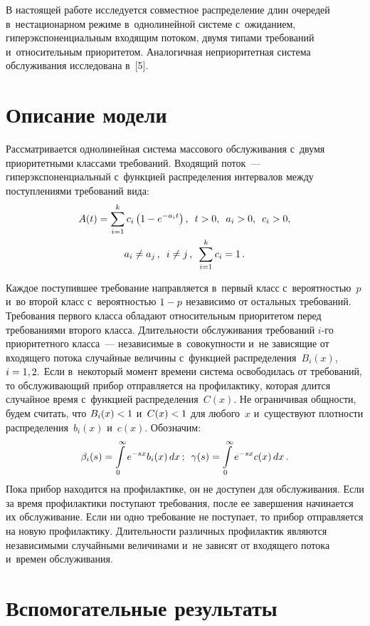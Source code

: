 \begin{multicols}{2}
В настоящей работе исследуется совместное распределение длин
очередей в~нестационарном режиме в~однолинейной системе 
с~ожиданием, гиперэкспоненциальным входящим потоком, двумя типами
требований и~относительным приоритетом. Аналогичная неприоритетная
система обслуживания исследована в~[5].

\vspace*{-6pt}

\section{Описание модели}

Рассматривается однолинейная система массового обслуживания 
с~двумя приоритетными классами требований. Входящий поток~---
гиперэкспоненциальный с~функцией распределения интервалов между
поступлениями требований вида:
\begin{multline*}
A(t)=\sum\limits_{i=1}^kc_i\left(1-e^{-a_it}\right),\enskip t>0,\enskip
a_i>0,\enskip c_i>0,\\
a_i\ne a_j\,,\enskip i\ne j\,,\enskip  \sum\limits_{i=1}^k c_i=1\,.
\end{multline*}

Каждое поступившее требование направляется в~первый класс 
с~вероятностью~$p$ и~во второй класс с~вероятностью $1\hm-p$
независимо от остальных требований. Требования первого класса
обладают относительным приоритетом перед требованиями второго
класса. Длительности обслуживания требований $i$-го приоритетного
класса~--- независимые в~совокупности и~не зависящие от входящего
потока случайные величины с~функцией распределения~$B_i(x)$,
$i\hm=1,2.$
 Если в~некоторый момент времени система освободилась от требований, 
 то обслуживающий прибор
 отправляется на профилактику, которая длится случайное время с~функцией 
 распределения~$C(x).$
 Не ограничивая общности, будем считать, что $B_i(x)\hm<1$
 и~$C(x)\hm<1$  для любого~$x$ 
 и~существуют плотности
 распределения~$b_i(x)$ и~$c(x).$
  Обозначим:
$$
 \beta_i(s)=\int\limits_0^{\infty}e^{-sx}b_i(x)\,dx\,;\enskip 
  \gamma(s)=\int\limits_0^{\infty}e^{-sx}c(x)\,dx\,.
$$
Пока прибор находится на профилактике, он не доступен для
обслуживания. Если за время профилактики поступают требования,
после ее завершения начинается их обслуживание. Если ни одно
требование не поступает, то прибор отправляется на новую
профилактику. Длительности различных профилактик являются
независимыми случайными величинами 
и~не зависят от входящего потока и~времен обслуживания.

\section{Вспомогательные результаты}


\end{multicols}
